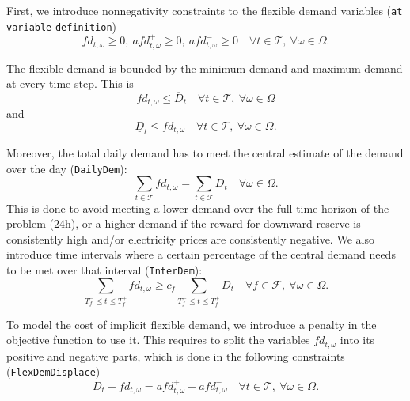 \documentclass{article}
\begin{document}
First, we introduce nonnegativity constraints to the flexible demand variables (\verb|at variable| \verb|definition|)
\begin{equation} \label{EQ:FlexDemandPos}
	fd_{t, \omega} \geq 0, \ afd_{t, \omega}^+ \geq 0, \ afd_{t, \omega}^- \geq 0 \quad \forall t \in \mathcal{T}, \ \forall \omega \in \Omega.
\end{equation}

The flexible demand is bounded by the minimum demand and maximum demand at every time step. This is
\begin{equation} \label{EQ:FlexDemand_UB_preliminary}
	fd_{t, \omega} \leq \overline{D}_t \quad \forall t \in \mathcal{T}, \ \forall \omega \in \Omega
\end{equation}
and 
\begin{equation} \label{EQ:FlexDemand_LB_preliminary}
	\underline{D}_t \leq fd_{t, \omega} \quad \forall t \in \mathcal{T}, \ \forall \omega \in \Omega.
\end{equation}

Moreover, the total daily demand has to meet the central estimate of the demand over the day (\verb|DailyDem|): 
\begin{equation} \label{EQ:DailyDem}
	\sum_{t \in \mathcal{T}} fd_{t, \omega} = \sum_{t \in \mathcal{T}} D_t \quad \forall \omega \in \Omega.
\end{equation}
This is done to avoid meeting a lower demand over the full time horizon of the problem ($24$h), or a higher demand if the reward for downward reserve is consistently high and/or electricity prices are consistently negative. We also introduce time intervals where a certain percentage of the central demand needs to be met over that interval (\verb|InterDem|):
\begin{equation} \label{EQ:InterDem}
	\sum_{T_f^- \leq t \leq T_f^+} fd_{t, \omega} \geq c_f \sum_{T_f^- \leq t \leq T_f^+} D_t \quad \forall f \in \mathcal{F}, \ \forall \omega \in \Omega.
\end{equation}

To model the cost of implicit flexible demand, we introduce a penalty in the objective function to use it. This requires to split the variables $fd_{t, \omega}$ into its positive and negative parts, which is done in the following constraints (\verb|FlexDemDisplace|)
\begin{equation} \label{EQ:FlexDemDisplace}
	D_t - fd_{t, \omega} = afd_{t, \omega}^+ - afd_{t, \omega}^- \quad \forall t \in \mathcal{T}, \ \forall \omega \in \Omega.
\end{equation}
\end{document}
